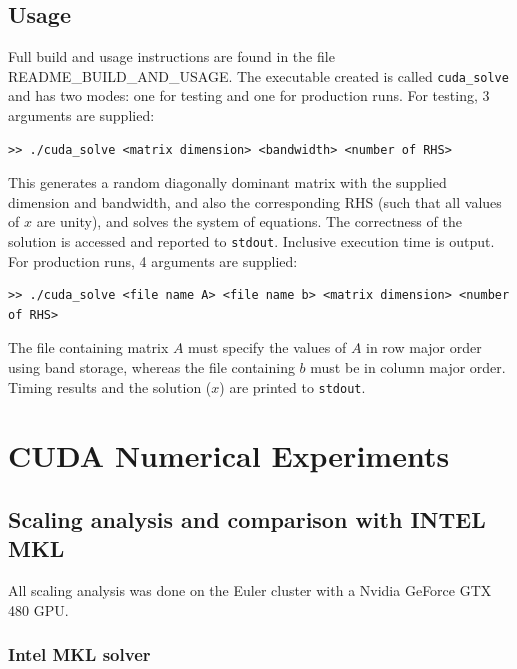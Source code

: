 \documentclass[12pt]{article}
\begin{document}
\subsection{Usage}
\label{usage}

Full build and usage instructions are found in
the file README\_BUILD\_AND\_USAGE. The executable created is called
\texttt{cuda\_solve} and has two modes: one for testing and one for production
runs. For testing, 3 arguments are supplied:

\begin{verbatim}
>> ./cuda_solve <matrix dimension> <bandwidth> <number of RHS> \end{verbatim}

\noindent
This generates a random diagonally dominant matrix with the supplied dimension
and bandwidth, and also the corresponding RHS (such that all values of $x$ are
unity), and solves the system of equations. The correctness of the solution is
accessed and reported to \texttt{stdout}. Inclusive execution time is output.
For production runs, 4 arguments are supplied:

\begin{verbatim}
>> ./cuda_solve <file name A> <file name b> <matrix dimension> <number of RHS>
\end{verbatim}

\noindent
The file containing matrix $A$ must specify the values of $A$ in row major order
using band storage, whereas the file containing $b$ must be in column major
order. Timing results and the solution ($x$) are printed to \texttt{stdout}.


\section{CUDA Numerical Experiments}
\label{sec:numericalexperiments}

\subsection{Scaling analysis and comparison with INTEL MKL}

All scaling analysis was done on the Euler cluster with a Nvidia GeForce GTX 480 GPU.

\subsubsection{Intel MKL solver}
\end{document}
